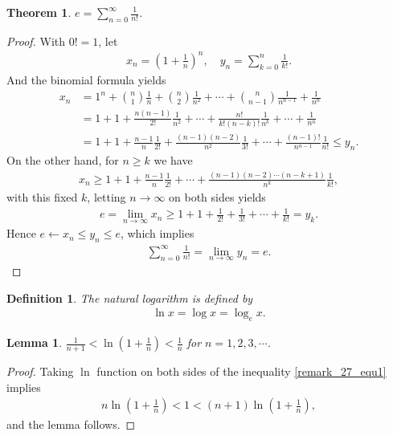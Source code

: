 \documentclass[10pt]{book}
\newtheorem{definition}{Definition}[chapter]
\newtheorem{theorem}{Theorem}[chapter]
\newtheorem{lemma}{Lemma}[chapter]
\theoremstyle{definition}
\numberwithin{equation}{chapter}
\begin{document}
\medskip

\begin{theorem}
$\displaystyle e = \sum^\infty_{n=0} \frac{1}{n!}$.
\end{theorem}
\begin{proof}
With $0! = 1$, let
\begin{align*}
    x_n = \left(1 + \frac{1}{n}\right)^n, \quad y_n = \sum^n_{k=0} \frac{1}{k!}.
\end{align*}
And the binomial formula yields
\begin{align*}
    x_n & = 1^n + \binom{n}{1} \frac{1}{n} + \binom{n}{2} \frac{1}{n^2} + \cdots + \binom{n}{n-1} \frac{1}{n^{n-1}} + \frac{1}{n^n} \\
    & = 1 + 1 + \frac{n(n-1)}{2!} \frac{1}{n^2} + \cdots + \frac{n!}{k!(n-k)!} \frac{1}{n^k} + \cdots + \frac{1}{n^n} \\
    & = 1 + 1 + \frac{n-1}{n} \frac{1}{2!} + \frac{(n-1)(n-2)}{n^2} \frac{1}{3!} + \cdots + \frac{(n-1)!}{n^{n-1}} \frac{1}{n!} \leq y_n.
\end{align*}
On the other hand, for $n \geq k$ we have
\begin{align*}
    x_n \geq 1 + 1 + \frac{n-1}{n} \frac{1}{2!} + \cdots + \frac{(n-1)(n-2)\cdots(n-k+1)}{n^k} \frac{1}{k!},
\end{align*}
with this fixed $k$, letting $n\to\infty$ on both sides yields
\begin{align*}
    e = \lim_{n\to\infty} x_n \geq 1 + 1 + \frac{1}{2!} + \frac{1}{3!} + \cdots + \frac{1}{k!} = y_k.
\end{align*}
Hence $e \leftarrow x_n \leq y_n \leq e$, which implies
\begin{align*}
    \sum^\infty_{n=0} \frac{1}{n!} = \lim_{n\to\infty} y_n = e.
\end{align*}
\end{proof}

\medskip

\begin{definition}
The natural logarithm is defined by
\begin{align*}
    \ln x = \log x = \log_e x.
\end{align*}
\end{definition}

\medskip

\begin{lemma}
$\displaystyle \frac{1}{n + 1} < \ln \left(1 + \frac{1}{n}\right) < \frac{1}{n}$ for $n = 1,2,3,\cdots$.
\end{lemma}
\begin{proof}
Taking $\ln$ function on both sides of the inequality \eqref{remark_27_equ1} implies 
\begin{align*}
    n \ln\left(1 + \frac{1}{n}\right) < 1 < (n+1) \ln \left(1 + \frac{1}{n}\right),
\end{align*}
and the lemma follows.
\end{proof}
\end{document}
